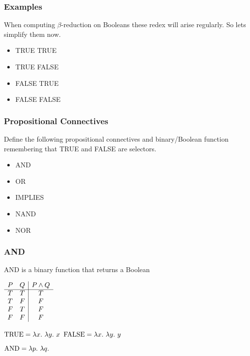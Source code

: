 \documentclass{beamer}
\begin{document}
\begin{frame}
	\frametitle{Examples}

	When computing $\beta$-reduction on Booleans these redex will arise regularly. So lets simplify them now.

	\begin{itemize}
		\item[] TRUE TRUE \vspace{1cm}
		\item[] TRUE FALSE \vspace{1cm}
		\item[] FALSE TRUE \vspace{1cm}
		\item[] FALSE FALSE \vspace{1cm} 
	\end{itemize}
	
\end{frame}

\begin{frame}
	\frametitle{Propositional Connectives}

	Define the following propositional connectives and binary/Boolean function remembering that TRUE and FALSE are selectors.

	\vspace{0.3cm}

	\begin{itemize}
		\item[] AND 
		\item[] OR 
		\item[] IMPLIES
		\item[] NAND 
		\item[] NOR
	\end{itemize}

	\vspace{2cm}

\end{frame}

\begin{frame}
	\frametitle{AND}

	AND is a binary function that returns a Boolean

	\begin{center}
		$\begin{array}{ c c | c }			
			P & Q & P \land Q\\
			\cline{1 - 3}
			T & T & T \\ 
			T & F & F \\ 
			F & T & F \\ 
			F & F & F
		\end{array}$
	\end{center}

	$\TRUE = \lambda x. \ \lambda y. \ x$ \hspace{4cm} $\FALSE = \lambda x. \ \lambda y. \ y$

	\vspace{0.5cm}

	$\AND = \lambda p. \ \lambda q. \  $

	\vspace{2cm}
	
\end{frame}
\end{document}
